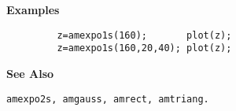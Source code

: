{\bf \large {}\selectfont Examples}
\begin{verbatim}
         z=amexpo1s(160);       plot(z);
         z=amexpo1s(160,20,40); plot(z);
\end{verbatim}
\vspace*{.5cm}


{\bf \large {}\selectfont See Also}\\
\hspace*{1.5cm}
\begin{minipage}[t]{13.5cm}
\begin{verbatim}
amexpo2s, amgauss, amrect, amtriang.
\end{verbatim}
\end{minipage}



